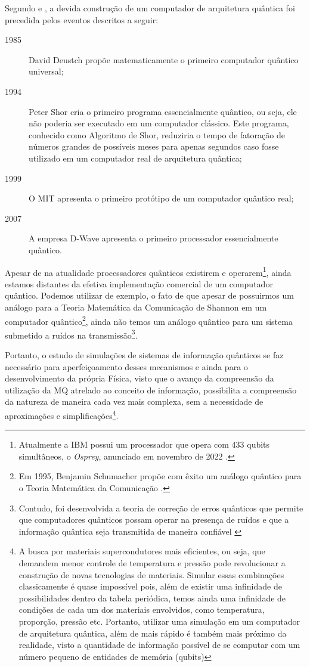 Segundo \textcite{CompInfoQuantica} e \textcite{dwave}, a devida construção de um computador de arquitetura quântica foi precedida pelos eventos descritos a seguir:

\begin{description}
  \item[1985] David Deustch propõe matematicamente o primeiro computador quântico universal;
  \item[1994] Peter Shor cria o primeiro programa essencialmente quântico, ou seja, ele não poderia ser executado em um computador clássico. Este programa, conhecido como Algoritmo de Shor, reduziria o tempo de fatoração de números grandes de possíveis meses para apenas segundos caso fosse utilizado em um computador real de arquitetura quântica;
  \item[1999] O MIT apresenta o primeiro protótipo de um computador quântico real;
  \item[2007] A empresa D-Wave apresenta o primeiro processador essencialmente quântico.
\end{description}

Apesar de na atualidade processadores quânticos existirem e operarem\footnote{Atualmente a IBM possui um processador que opera com 433 qubits simultâneos, o \textit{Osprey}, anunciado em novembro de 2022 \cite{osprey}.}, ainda estamos distantes da efetiva implementação comercial de um computador quântico. Podemos utilizar de exemplo, o fato de que apesar de possuirmos um análogo para a Teoria Matemática da Comunicação de Shannon em um computador quântico\footnote{Em 1995, Benjamin Schumacher propõe com êxito um análogo quântico para o Teoria Matemática da Comunicação \cite{benschu}.}, ainda não temos um análogo quântico para um sistema submetido a ruídos na transmissão\footnote{Contudo, foi desenvolvida a teoria de correção de erros quânticos que permite que computadores quânticos possam operar na presença de ruídos e que a informação quântica seja transmitida de maneira confiável \cite{chuang}}\cite{chuang}.

Portanto, o estudo de simulações de sistemas de informação quânticos se faz necessário para aperfeiçoamento desses mecanismos e ainda para o desenvolvimento da própria Física, visto que o avanço da compreensão da utilização da MQ atrelado ao conceito de informação, possibilita a compreensão da natureza de maneira cada vez mais complexa, sem a necessidade de aproximações e simplificações\footnote{A busca por materiais supercondutores mais eficientes, ou seja, que demandem menor controle de temperatura e pressão pode revolucionar a construção de novas tecnologias de materiais. Simular essas combinações classicamente é quase impossível pois, além de existir uma infinidade de possibilidades dentro da tabela periódica, temos ainda uma infinidade de condições de cada um dos materiais envolvidos, como temperatura, proporção, pressão etc. Portanto, utilizar uma simulação em um computador de arquitetura quântica, além de mais rápido é também mais próximo da realidade, visto a quantidade de informação possível de se computar com um número pequeno de entidades de memória (qubits)\cite{videoyoutube}}\cite{videoyoutube}.


